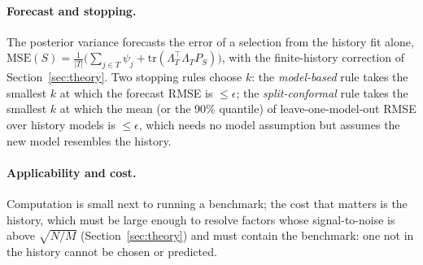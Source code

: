 \paragraph{Forecast and stopping.}
The posterior variance forecasts the error of a selection from the history fit alone, $\mathrm{MSE}(S)=\frac1{|T|}\bigl(\sum_{j\in T}\psi_j+\mathrm{tr}(\Lambda_T^\top\Lambda_T P_S)\bigr)$, with the finite-history correction of Section~\ref{sec:theory}.
Two stopping rules choose $k$: the \emph{model-based} rule takes the smallest $k$ at which the forecast RMSE is $\le\epsilon$; the \emph{split-conformal} rule \citep{lei2018distribution} takes the smallest $k$ at which the mean (or the 90\% quantile) of leave-one-model-out RMSE over history models is $\le\epsilon$, which needs no model assumption but assumes the new model resembles the history.

\paragraph{Applicability and cost.}
Computation is small next to running a benchmark; the cost that matters is the history, which must be large enough to resolve factors whose signal-to-noise is above $\sqrt{N/M}$ (Section~\ref{sec:theory}) and must contain the benchmark: one not in the history cannot be chosen or predicted.
